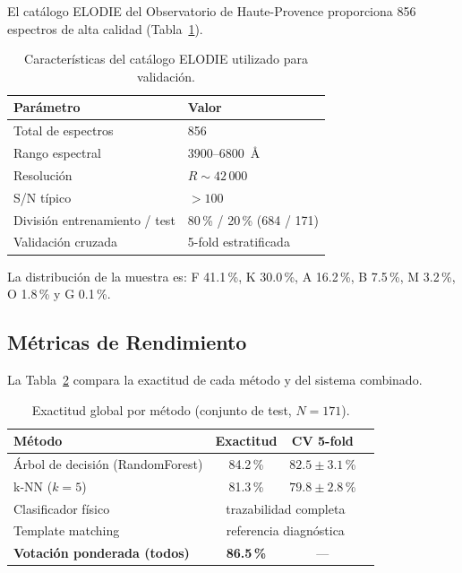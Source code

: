 \documentclass[12pt,a4paper]{article}
\begin{document}
El catálogo ELODIE del Observatorio de Haute-Provence proporciona 856 espectros
de alta calidad (Tabla~\ref{tab:elodie}).

\begin{table}[H]
  \centering
  \caption{Características del catálogo ELODIE utilizado para validación.}
  \label{tab:elodie}
  \renewcommand{\arraystretch}{1.2}
  \begin{tabular}{ll}
    \toprule
    \textbf{Parámetro} & \textbf{Valor} \\
    \midrule
    Total de espectros & 856 \\
    Rango espectral & 3900--6800~\AA \\
    Resolución & $R \sim 42\,000$ \\
    S/N típico & $> 100$ \\
    División entrenamiento / test & 80\,\% / 20\,\% (684 / 171) \\
    Validación cruzada & 5-fold estratificada \\
    \bottomrule
  \end{tabular}
\end{table}

La distribución de la muestra es: F 41.1\,\%, K 30.0\,\%, A 16.2\,\%, B 7.5\,\%,
M 3.2\,\%, O 1.8\,\% y G 0.1\,\%.

\subsection{Métricas de Rendimiento}

La Tabla~\ref{tab:metricas} compara la exactitud de cada método y del sistema combinado.

\begin{table}[H]
  \centering
  \caption{Exactitud global por método (conjunto de test, $N=171$).}
  \label{tab:metricas}
  \renewcommand{\arraystretch}{1.2}
  \begin{tabular}{lccc}
    \toprule
    \textbf{Método} & \textbf{Exactitud} & \textbf{CV 5-fold} \\
    \midrule
    Árbol de decisión (RandomForest) & 84.2\,\% & $82.5 \pm 3.1$\,\% \\
    k-NN ($k=5$) & 81.3\,\% & $79.8 \pm 2.8$\,\% \\
    Clasificador físico & \multicolumn{2}{c}{trazabilidad completa} \\
    Template matching & \multicolumn{2}{c}{referencia diagnóstica} \\
    \midrule
    \textbf{Votación ponderada (todos)} & \textbf{86.5\,\%} & — \\
    \bottomrule
  \end{tabular}
\end{table}
\end{document}
